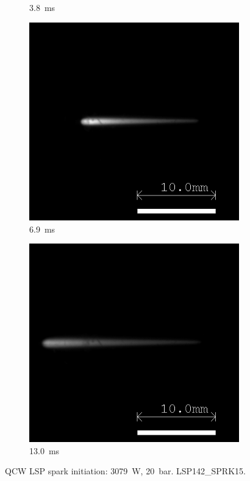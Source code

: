 \begin{figure}[!ht]
\begin{subfigure}[t]{0.3\textwidth}
        \caption{\qty{3.8}{ms}}
    \end{subfigure}
    \hfill
    \begin{subfigure}[t]{0.3\textwidth}
        \centering
        \includegraphics[width=\textwidth]{assets/4 experiments/V1 Spark Ignition Frames/LSP142_SPRK15_Fr69.png}
        \caption{\qty{6.9}{ms}}
    \end{subfigure}
    \hfill
    \begin{subfigure}[t]{0.3\textwidth}
        \centering
        \includegraphics[width=\textwidth]{assets/4 experiments/V1 Spark Ignition Frames/LSP142_SPRK15_Fr130.png}
        \caption{\qty{13.0}{ms}}
    \end{subfigure}
    \caption{QCW LSP spark initiation: \qty{3079}{W}, \qty{20}{bar}. LSP142\_SPRK15.}
    \label{fig:V1_spark_initiation_frames}
\end{figure}